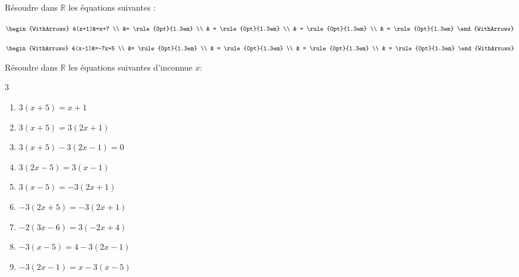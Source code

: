 \begin{example}  Résoudre dans $\mathbb{R}$ les équations suivantes :\hfill 
	
\noindent \parbox{0.45\linewidth}{	
	$\begin{WithArrows}
		4(x+1)&=x+7 \\
		&= \rule{0pt}{1.3em} \\
		& = \rule{0pt}{1.3em}  \\
		& = \rule{0pt}{1.3em}  \\
		& = \rule{0pt}{1.3em}  
	\end{WithArrows}$ 	
}\hfill \parbox{0.45\linewidth}{	
	$\begin{WithArrows}
		4(x-1)&=-7x+5 \\
		&= \rule{0pt}{1.3em} \\
		& = \rule{0pt}{1.3em}  \\
		& = \rule{0pt}{1.3em}  \\
		& = \rule{0pt}{1.3em} 
	\end{WithArrows}$ 
}  
\end{example} 
\begin{exercise}\label{chapter07:exercice:equationA} Résoudre dans $\mathbb{R}$ les équations suivantes d'inconnue $x$: \hfill 
	\begin{multicols}{3}
 		\begin{enumerate}[label={$(E_{\arabic*})$}, leftmargin=*]
			\item $3(x+5)=x+1$
			\item $3(x+5)=3(2x+1)$
			\item $3(x+5)-3(2x-1)=0$
			\item $3(2x-5)=3(x-1)$
			\item $3(x-5)=-3(2x+1)$ 
			\item $-3(2x+5)=-3(2x+1)$
			\item $-2(3x-6)=3(-2x+4)$
			\item $-3(x-5)=4-3(2x-1)$
			\item $-3(2x-1)=x-3(x-5)$ 
		\end{enumerate}
	\end{multicols} 	
\end{exercise}

